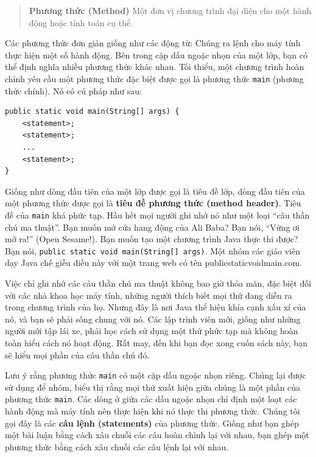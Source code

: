 \begin{quote}
\textbf{Phương thức (Method)} Một đơn vị chương trình đại diện cho một
hành động hoặc tính toán cụ thể.
\end{quote}

Các phương thức đơn giản giống như các động từ: Chúng ra lệnh cho máy
tính thực hiện một số hành động. Bên trong cặp dấu ngoặc nhọn của một
lớp, bạn có thể định nghĩa nhiều phương thức khác nhau. Tối thiểu, một
chương trình hoàn chỉnh yêu cầu một phương thức đặc biệt được gọi là
phương thức \texttt{main} (phương thức chính). Nó có cú pháp như sau:

\begin{verbatim}
public static void main(String[] args) {
    <statement>;
    <statement>;
    ...
    <statement>;
}
\end{verbatim}

Giống như dòng đầu tiên của một lớp được gọi là tiêu đề lớp, dòng đầu
tiên của một phương thức được gọi là \textbf{tiêu đề phương thức (method
header)}. Tiêu đề của \texttt{main} khá phức tạp. Hầu hết mọi người ghi
nhớ nó như một loại ``câu thần chú ma thuật''. Bạn muốn mở cửa hang động
của Ali Baba? Bạn nói, ``Vừng ơi mở ra!'' (Open Sesame!). Bạn muốn tạo
một chương trình Java thực thi được? Bạn nói,
\texttt{public\ static\ void\ main(String{[}{]}\ args)}. Một nhóm các
giáo viên dạy Java chế giễu điều này với một trang web có tên
publicstaticvoidmain.com.

Việc chỉ ghi nhớ các câu thần chú ma thuật không bao giờ thỏa mãn, đặc
biệt đối với các nhà khoa học máy tính, những người thích biết mọi thứ
đang diễn ra trong chương trình của họ. Nhưng đây là nơi Java thể hiện
khía cạnh xấu xí của nó, và bạn sẽ phải sống chung với nó. Các lập trình
viên mới, giống như những người mới tập lái xe, phải học cách sử dụng
một thứ phức tạp mà không hoàn toàn hiểu cách nó hoạt động. Rất may, đến
khi bạn đọc xong cuốn sách này, bạn sẽ hiểu mọi phần của câu thần chú
đó.

Lưu ý rằng phương thức \texttt{main} có một cặp dấu ngoặc nhọn riêng.
Chúng lại được sử dụng để nhóm, biểu thị rằng mọi thứ xuất hiện giữa
chúng là một phần của phương thức \texttt{main}. Các dòng ở giữa các dấu
ngoặc nhọn chỉ định một loạt các hành động mà máy tính nên thực hiện khi
nó thực thi phương thức. Chúng tôi gọi đây là các \textbf{câu lệnh
(statements)} của phương thức. Giống như bạn ghép một bài luận bằng cách
xâu chuỗi các câu hoàn chỉnh lại với nhau, bạn ghép một phương thức bằng
cách xâu chuỗi các câu lệnh lại với nhau.

